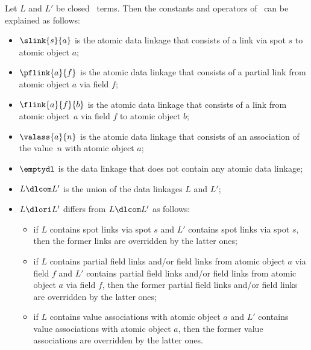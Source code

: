 \documentclass[fleqn]{llncs}
\begin{document}
Let $L$ and $L'$ be closed \DLA\ terms.
Then the constants and operators of \DLA\ can be explained as follows:
\begin{itemize}
\item
$\slink{s}{a}$ is the atomic data linkage that consists of a link via
spot $s$ to atomic object $a$;
\item
$\pflink{a}{f}$ is the atomic data linkage that consists of a partial
link from atomic object $a$ via field $f$;
\item
$\flink{a}{f}{b}$ is the atomic data linkage that consists of a link
from atomic object~$a$ via field $f$ to atomic object $b$;
\item
$\valass{a}{n}$ is the atomic data linkage that consists of an
association of the value~$n$ with atomic object $a$;
\item
$\emptydl$ is the data linkage that does not contain any atomic data
linkage;
\item
$L \dlcom L'$ is the union of the data linkages $L$ and $L'$;
\item
$L \dlori L'$ differs from $L \dlcom L'$ as follows:
\begin{itemize}
\item
if $L$ contains spot links via spot $s$ and $L'$ contains spot links via
spot $s$, then the former links are overridden by the latter ones;
\item
if $L$ contains partial field links and/or field links from atomic
object $a$ via field $f$ and $L'$ contains partial field links and/or
field links from atomic object $a$ via field $f$, then the former
partial field links and/or field links are overridden by the latter
ones;
\item
if $L$ contains value associations with atomic object $a$ and $L'$
contains value associations with atomic object $a$, then the former
value associations are overridden by the latter ones.
\end{itemize}
\end{itemize}
\end{document}
